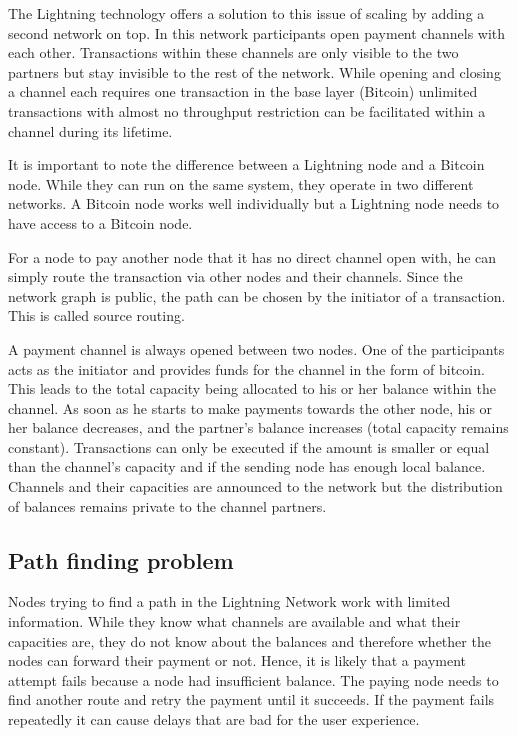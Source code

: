 \documentclass[final]{fhnwreport}       %
\begin{document}
The Lightning technology offers a solution to this issue of scaling by adding a second network on top. In this network participants open payment channels with each other. Transactions within these channels are only visible to the two partners but stay invisible to the rest of the network. While opening and closing a channel each requires one transaction in the base layer (Bitcoin) unlimited transactions with almost no throughput restriction can be facilitated within a channel during its lifetime. 

It is important to note the difference between a Lightning node and a Bitcoin node. While they can run on the same system, they operate in two different networks. A Bitcoin node works well individually but a Lightning node needs to have access to a Bitcoin node.

For a node to pay another node that it has no direct channel open with, he can simply route the transaction via other nodes and their channels. Since the network graph is public, the path can be chosen by the initiator of a transaction. This is called source routing. 

A payment channel is always opened between two nodes. One of the participants acts as the initiator and provides funds for the channel in the form of bitcoin. This leads to the total capacity being allocated to his or her balance within the channel. As soon as he starts to make payments towards the other node, his or her balance decreases, and the partner's balance increases (total capacity remains constant). Transactions can only be executed if the amount is smaller or equal than the channel's capacity and if the sending node has enough local balance. Channels and their capacities are announced to the network but the distribution of balances remains private to the channel partners.

\subsection{Path finding problem}
Nodes trying to find a path in the Lightning Network work with limited information. While they know what channels are available and what their capacities are, they do not know about the balances and therefore whether the nodes can forward their payment or not. Hence, it is likely that a payment attempt fails because a node had insufficient balance. The paying node needs to find another route and retry the payment until it succeeds. If the payment fails repeatedly it can cause delays that are bad for the user experience. 
\end{document}
